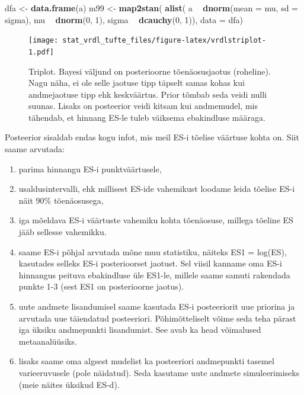\documentclass[]{book}
\newenvironment{Shaded}{\begin{snugshade}}{\end{snugshade}}
\newcommand{\DataTypeTok}[1]{\textcolor[rgb]{0.13,0.29,0.53}{#1}}
\newcommand{\DecValTok}[1]{\textcolor[rgb]{0.00,0.00,0.81}{#1}}
\newcommand{\KeywordTok}[1]{\textcolor[rgb]{0.13,0.29,0.53}{\textbf{#1}}}
\newcommand{\NormalTok}[1]{#1}
\newcommand{\OperatorTok}[1]{\textcolor[rgb]{0.81,0.36,0.00}{\textbf{#1}}}
\newcommand{\StringTok}[1]{\textcolor[rgb]{0.31,0.60,0.02}{#1}}
\begin{document}
\begin{Shaded}
\begin{Highlighting}[]
\NormalTok{dfa <-}\StringTok{ }\KeywordTok{data.frame}\NormalTok{(a)}
\NormalTok{m99 <-}\StringTok{ }\KeywordTok{map2stan}\NormalTok{(}
  \KeywordTok{alist}\NormalTok{(}
\NormalTok{    a }\OperatorTok{~}\StringTok{ }\KeywordTok{dnorm}\NormalTok{(}\DataTypeTok{mean =}\NormalTok{ mu, }\DataTypeTok{sd =}\NormalTok{ sigma),}
\NormalTok{    mu  }\OperatorTok{~}\StringTok{ }\KeywordTok{dnorm}\NormalTok{(}\DecValTok{0}\NormalTok{, }\DecValTok{1}\NormalTok{), }
\NormalTok{    sigma }\OperatorTok{~}\StringTok{ }\KeywordTok{dcauchy}\NormalTok{(}\DecValTok{0}\NormalTok{, }\DecValTok{1}\NormalTok{)), }
  \DataTypeTok{data =}\NormalTok{ dfa)}
\end{Highlighting}
\end{Shaded}

\begin{figure}
\centering
\texttt{[image: stat\_vrdl\_tufte\_files/figure-latex/vrdlstriplot-1.pdf]}
\caption{\label{fig:vrdlstriplot}Triplot. Bayesi väljund on posterioorne tõenäosusjaotus (roheline). Nagu näha, ei ole selle jaotuse tipp täpselt samas kohas kui andmejaotuse tipp ehk keskväärtus. Prior tõmbab seda veidi nulli suunas. Lisaks on posteerior veidi kitsam kui andmemudel, mis tähendab, et hinnang ES-le tuleb väiksema ebakindluse määraga.}
\end{figure}

Posteerior sisaldab endas kogu infot, mis meil ES-i tõelise väärtuse kohta on.
Siit saame arvutada:

\begin{enumerate}
\def\labelenumi{\arabic{enumi}.}
\item
  parima hinnangu ES-i punktväärtusele,
\item
  usaldusintervalli, ehk millisest ES-ide vahemikust loodame leida tõelise ES-i näit 90\% tõenäosusega,
\item
  iga mõeldava ES-i väärtuste vahemiku kohta tõenäosuse, millega tõeline ES jääb sellesse vahemikku.
\item
  saame ES-i põhjal arvutada mõne muu statistiku, näiteks ES1 = log(ES), kasutades selleks ES-i posterioorset jaotust. Sel viisil kanname oma ES-i hinnangus peituva ebakindluse üle ES1-le, millele saame samuti rakendada punkte 1-3 (sest ES1 on posterioorne jaotus).
\item
  uute andmete lisandumisel saame kasutada ES-i posteeriorit uue priorina ja arvutada uue täiendatud posteeriori. Põhimõtteliselt võime seda teha pärast iga üksiku andmepunkti lisandumist. See avab ka head võimalused metaanalüüsiks.
\item
  lisaks saame oma algsest mudelist ka posteeriori andmepunkti tasemel varieeruvusele (pole näidatud). Seda kasutame uute andmete simuleerimiseks (meie näites üksikud ES-d).
\end{enumerate}
\end{document}
